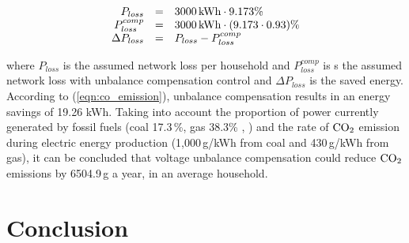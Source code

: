             \begin{equation}
                \label{eqn:co_emission}
                \begin{array}{rcl}
                 P_{loss}&=&3000\,\textnormal{kWh}\cdot9.173\%\\
                P^{comp}_{loss}&=&3000\,\textnormal{kWh}\cdot(9.173\cdot0.93)\%\\
                 \Delta P_{loss}&=&P_{loss}-P^{comp}_{loss}\\
                 \end{array}
                \end{equation}

            where $P_{loss}$ is the assumed network loss per household and $P^{comp}_{loss}$ is s the assumed network loss with unbalance compensation control and $\Delta P_{loss}$ is the saved energy. According to (\ref{eqn:co_emission}), unbalance compensation results in an energy savings of 19.26 kWh. Taking into account the proportion of power currently generated by fossil fuels (coal 17.3\,\%, gas 38.3\% \cite{MVM2013}, \cite{gorbe2012reduction}) and the rate of $\textnormal{CO}_2$ emission during electric energy production (1,000\,g/kWh from coal and 430\,g/kWh from gas), it can be concluded that voltage unbalance compensation could reduce $\textnormal{CO}_2$ emissions by 6504.9\,g a year, in an average household. %

\section{Conclusion}

